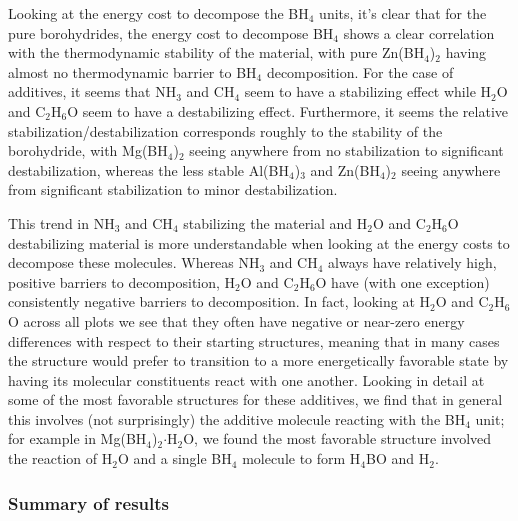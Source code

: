 \documentclass[twocolumn, prb, showpacs]{revtex4-1}
\begin{document}
Looking at the energy cost to decompose the BH$_4$ units, it's clear that
for the pure borohydrides, the energy cost to decompose BH$_4$ shows a clear
correlation with the thermodynamic stability of the material, with pure Zn(BH$_4$)$_2$
having almost no thermodynamic barrier to BH$_4$ decomposition. 
For the case of additives, it seems that NH$_3$ and CH$_4$ seem to have a stabilizing
effect while H$_2$O and C$_2$H$_6$O seem to have a destabilizing effect. Furthermore,
it seems the relative stabilization/destabilization corresponds roughly to the stability of
the borohydride, with Mg(BH$_4$)$_2$ seeing anywhere from no stabilization to significant
destabilization, whereas the less stable Al(BH$_4$)$_3$ and Zn(BH$_4$)$_2$ seeing
anywhere from significant stabilization to minor destabilization.

This trend in NH$_3$ and CH$_4$ stabilizing the material and H$_2$O and C$_2$H$_6$O
destabilizing material is more understandable when looking at the energy costs
to decompose these molecules. Whereas NH$_3$ and CH$_4$ always have relatively
high, positive barriers to decomposition, H$_2$O and C$_2$H$_6$O have (with one exception) consistently
negative barriers to decomposition. In fact, looking at H$_2$O and C$_2$H$_6$O
across all plots we see that they often have negative or near-zero energy
differences with respect to their starting structures, meaning that in many
cases the structure would prefer to transition to a more energetically favorable
state by having its molecular constituents react with one another. Looking in 
detail at some of the most favorable structures for these additives, we find
that in general this involves (not surprisingly) the additive molecule reacting
with the BH$_4$ unit; for example in Mg(BH$_4$)$_2$$\cdot$H$_2$O, we found the 
most favorable structure involved the reaction of H$_2$O and a single
BH$_4$ molecule to form H$_4$BO and H$_2$. 

\subsubsection{Summary of results}
\end{document}
